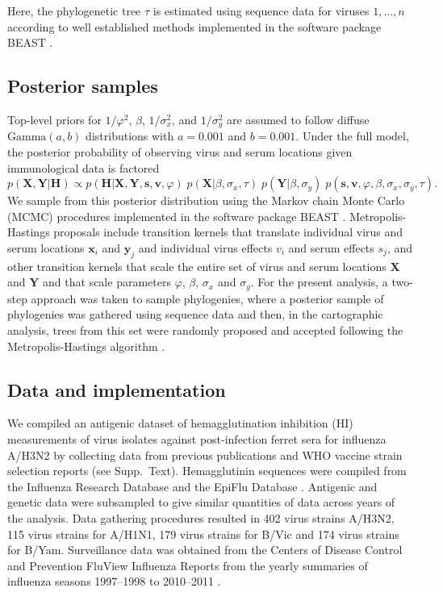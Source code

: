 \documentclass[11pt,oneside,letterpaper]{article}
\newcommand{\virus}{\mathbf{x}}						%
\newcommand{\serum}{\mathbf{y}}						%
\newcommand{\viruses}{\mathbf{X}}					%
\newcommand{\sera}{\mathbf{Y}}						%
\newcommand{\ve}{v}									%
\newcommand{\se}{s}									%
\newcommand{\ves}{\mathbf{v}}						%
\newcommand{\ses}{\mathbf{s}}						%
\newcommand{\mdssd}{\varphi}						%
\newcommand{\virussd}{\sigma_x}						%
\newcommand{\serumsd}{\sigma_y}						%
\newcommand{\tree}{\tau}							%
\newcommand{\vn}{n}									%
\begin{document}
Here, the phylogenetic tree $\tree$ is estimated using sequence data for viruses $1,\ldots,\vn$ according to well established methods implemented in the software package BEAST \cite{BEAST17}.

\subsection*{Posterior samples}

Top-level priors for $1/\mdssd^2$, $\beta$, $1/\virussd^2$, and $1/\serumsd^2$ are assumed to follow diffuse $\mbox{Gamma}(a, b)$ distributions  with $a=0.001$ and $b=0.001$.
Under the full model, the posterior probability of observing virus and serum locations given immunological data is factored
\begin{equation}
	p(\viruses,\sera | \mathbf{H}) \propto p(\mathbf{H} | \viruses, \sera, \ses, \ves, \mdssd) \; 
	p(\viruses | \beta, \virussd, \tree) \;
	p(\sera | \beta, \serumsd) \; 
	p(\ses, \ves, \mdssd, \beta, \virussd, \serumsd, \tree).
\end{equation}
We sample from this posterior distribution using the Markov chain Monte Carlo (MCMC) procedures implemented in the software package BEAST \cite{BEAST17}.
Metropolis-Hastings proposals include transition kernels that translate individual virus and serum locations $\virus_i$ and $\serum_j$ and individual virus effects $\ve_i$ and serum effects $\se_j$, and other transition kernels that scale the entire set of virus and serum locations $\viruses$ and $\sera$ and that scale parameters $\mdssd$, $\beta$, $\virussd$ and $\serumsd$.
For the present analysis, a two-step approach was taken to sample phylogenies, where a posterior sample of phylogenies was gathered using sequence data and then, in the cartographic analysis, trees from this set were randomly proposed and accepted following the Metropolis-Hastings algorithm \cite{Pagel04}.

\subsection*{Data and implementation}

We compiled an antigenic dataset of hemagglutination inhibition (HI) measurements of virus isolates against post-infection ferret sera for influenza A/H3N2 by collecting data from previous publications and WHO vaccine strain selection reports (see Supp.\ Text).
Hemagglutinin sequences were compiled from the Influenza Research Database \cite{IRD} and the EpiFlu Database \cite{GISAID}.
Antigenic and genetic data were subsampled to give similar quantities of data across years of the analysis.
Data gathering procedures resulted in 402 virus strains A/H3N2, 115 virus strains for A/H1N1, 179 virus strains for B/Vic and 174 virus strains for B/Yam.
Surveillance data was obtained from the Centers of Disease Control and Prevention FluView Influenza Reports from the yearly summaries of influenza seasons 1997--1998 to 2010--2011 \cite{CDCReports}.
\end{document}
